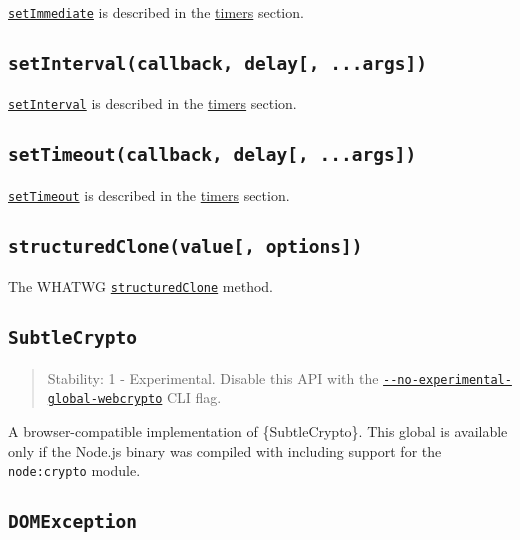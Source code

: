 \href{timers.md\#setimmediatecallback-args}{\texttt{setImmediate}} is
described in the \href{timers.md}{timers} section.

\subsection{\texorpdfstring{\texttt{setInterval(callback,\ delay{[},\ ...args{]})}}{setInterval(callback, delay{[}, ...args{]})}}\label{setintervalcallback-delay-...args}

\href{timers.md\#setintervalcallback-delay-args}{\texttt{setInterval}}
is described in the \href{timers.md}{timers} section.

\subsection{\texorpdfstring{\texttt{setTimeout(callback,\ delay{[},\ ...args{]})}}{setTimeout(callback, delay{[}, ...args{]})}}\label{settimeoutcallback-delay-...args}

\href{timers.md\#settimeoutcallback-delay-args}{\texttt{setTimeout}} is
described in the \href{timers.md}{timers} section.

\subsection{\texorpdfstring{\texttt{structuredClone(value{[},\ options{]})}}{structuredClone(value{[}, options{]})}}\label{structuredclonevalue-options}

The WHATWG
\href{https://developer.mozilla.org/en-US/docs/Web/API/structuredClone}{\texttt{structuredClone}}
method.

\subsection{\texorpdfstring{\texttt{SubtleCrypto}}{SubtleCrypto}}\label{subtlecrypto}

\begin{quote}
Stability: 1 - Experimental. Disable this API with the
\href{cli.md\#--no-experimental-global-webcrypto}{\texttt{-\/-no-experimental-global-webcrypto}}
CLI flag.
\end{quote}

A browser-compatible implementation of \{SubtleCrypto\}. This global is
available only if the Node.js binary was compiled with including support
for the \texttt{node:crypto} module.

\subsection{\texorpdfstring{\texttt{DOMException}}{DOMException}}\label{domexception}

